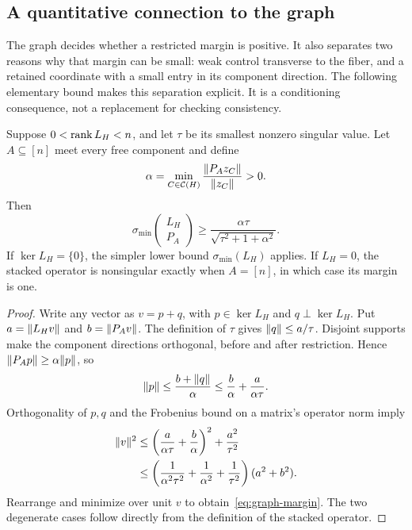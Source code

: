 \subsection{A quantitative connection to the graph}
The graph decides whether a restricted margin is positive. It also separates two reasons why that margin can be small: weak control transverse to the fiber, and a retained coordinate with a small entry in its component direction. The following elementary bound makes this separation explicit. It is a conditioning consequence, not a replacement for checking consistency.

\begin{proposition}\label{prop:graph-margin}
Suppose $0<\operatorname{rank} L_H<n$, and let $\tau$ be its smallest nonzero singular value. Let $A\subseteq[n]$ meet every free component and define
\begin{equation}\label{eq:alpha-margin}
 \alpha=\min_{C\in\mathcal C(H)}
 \frac{\lVert P_Az_C\rVert}{\lVert z_C\rVert}>0.
\end{equation}
Then
\begin{equation}\label{eq:graph-margin}
 \sigma_{\min}\!\begin{pmatrix}L_H\\P_A\end{pmatrix}
 \ge \frac{\alpha\tau}{\sqrt{\tau^2+1+\alpha^2}}.
\end{equation}
If $\ker L_H=\{0\}$, the simpler lower bound $\sigma_{\min}(L_H)$ applies. If $L_H=0$, the stacked operator is nonsingular exactly when $A=[n]$, in which case its margin is one.
\end{proposition}
\begin{proof}
Write any vector as $v=p+q$, with $p\in\ker L_H$ and $q\perp\ker L_H$. Put $a=\lVert L_Hv\rVert$ and $b=\lVert P_Av\rVert$. The definition of $\tau$ gives $\lVert q\rVert\le a/\tau$. Disjoint supports make the component directions orthogonal, before and after restriction. Hence $\lVert P_Ap\rVert\ge\alpha\lVert p\rVert$, so
\[
 \lVert p\rVert\le \frac{b+\lVert q\rVert}{\alpha}
 \le\frac{b}{\alpha}+\frac{a}{\alpha\tau}.
\]
Orthogonality of $p,q$ and the Frobenius bound on a matrix's operator norm imply
\begin{align*}
 \lVert v\rVert^2
 &\le\left(\frac{a}{\alpha\tau}+\frac{b}{\alpha}\right)^2
       +\frac{a^2}{\tau^2}\\
 &\le\left(\frac{1}{\alpha^2\tau^2}
           +\frac{1}{\alpha^2}+\frac{1}{\tau^2}\right)(a^2+b^2).
\end{align*}
Rearrange and minimize over unit $v$ to obtain~\eqref{eq:graph-margin}. The two degenerate cases follow directly from the definition of the stacked operator.
\end{proof}

